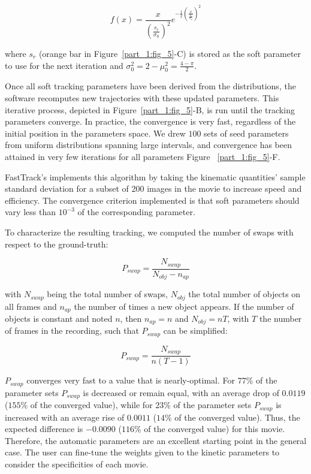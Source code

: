     \begin{equation}
        f(x)=\frac{x}{(\frac{s_{r}}{\sigma_0})^2}e^{-\frac{1}{2}(\frac{x}{\frac{s_{r}}{\sigma_0}})^2}
        \label{eq1}
    \end{equation}

    \noindent where $s_r$ (orange bar in Figure~\ref{part_1:fig_5}-C) is stored as the soft parameter to use for the next iteration and $\sigma_0^2=2-\mu_0^2=\frac{4-\pi}{2}$.

    Once all soft tracking parameters have been derived from the distributions, the software recomputes new trajectories with these updated parameters. This iterative process, depicted in Figure~\ref{part_1:fig_5}-B, is run until the tracking parameters converge. In practice, the convergence is very fast, regardless of the initial position in the parameters space. We drew $100$ sets of seed parameters from uniform distributions spanning large intervals, and convergence has been attained in very few iterations for all parameters Figure ~\ref{part_1:fig_5}-F.

    FastTrack's implements this algorithm by taking the kinematic quantities' sample standard deviation for a subset of 200 images in the movie to increase speed and efficiency. The convergence criterion implemented is that soft parameters should vary less than $10^{-3}$ of the corresponding parameter.

    To characterize the resulting tracking, we computed the number of swaps with respect to the ground-truth:

    \begin{equation}
    P_{swap} = \frac{N_{swap}}{N_{obj} - n_{ap}}
    \label{eq:Pswap}
    \end{equation}

    \noindent with $N_{swap}$ being the total number of swaps, $N_{obj}$ the total number of objects on all frames and $n_{ap}$ the number of times a new object appears. If the number of objects is constant and noted $n$, then $n_{ap} = n$ and $N_{obj} = nT$, with $T$ the number of frames in the recording, such that $P_{swap}$ can be simplified:

    \begin{equation}
    P_{swap} = \frac{N_{swap}}{n(T-1)}
    \label{eq:Pswap_constant}
    \end{equation}

    $P_{swap}$ converges very fast to a value that is nearly-optimal. For $77\%$ of the parameter sets $P_{swap}$ is decreased or remain equal, with an average drop of $0.0119$ ($155$\% of the converged value), while for 23\% of the parameter sets $P_{swap}$ is increased with an average rise of $0.0011$ ($14$\% of the converged value). Thus, the expected difference is $-0.0090$ ($116$\% of the converged value) for this movie. Therefore, the automatic parameters are an excellent starting point in the general case. The user can fine-tune the weights given to the kinetic parameters to consider the specificities of each movie.

